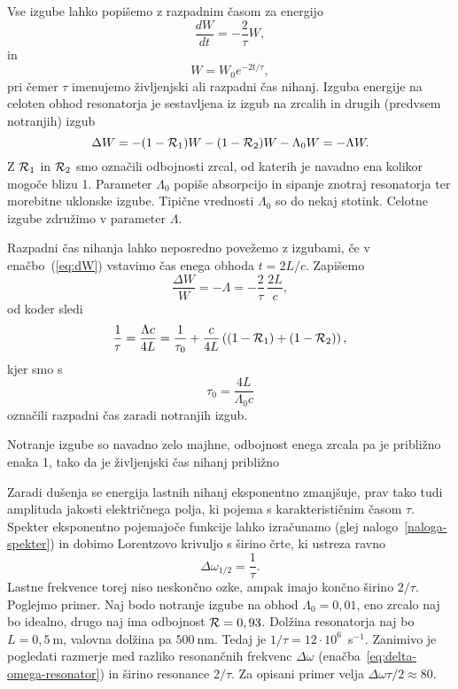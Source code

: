 Vse izgube lahko popišemo z razpadnim časom za energijo 
\begin{equation}
\frac{dW}{dt}=-\frac{2}{\tau}W,
\label{eq:dW}
\end{equation}
in 
\begin{equation}
W = W_0 e^{-2t/\tau},
\label{eq:dW1}
\end{equation}
pri čemer $\tau$ imenujemo življenjski ali razpadni čas nihanj.
Izguba energije na celoten obhod resonatorja je
sestavljena iz izgub na zrcalih in drugih (predvsem notranjih) izgub
\begin{equation}
\Delta W = -(1-{\cal R}_{1})W-(1-{\cal R}_{2})W -\Lambda_{0} W = -\Lambda W.
\label{eq:Lambda}
\end{equation}
Z ${\cal R}_{1}$ in ${\cal R}_{2}$ smo označili odbojnosti zrcal, od katerih je navadno ena
kolikor mogoče blizu 1. Parameter $\Lambda_{0}$ popiše absorpcijo in
sipanje znotraj resonatorja ter morebitne uklonske izgube. Tipične vrednosti 
$\Lambda_0$ so do nekaj stotink. Celotne izgube združimo v parameter $\Lambda$. 

Razpadni čas nihanja lahko neposredno povežemo z izgubami, če v enačbo~(\ref{eq:dW})
vstavimo čas enega obhoda $t=2L/c$. Zapišemo
\begin{equation}
\frac{\Delta W}{W}= -\Lambda = -\frac{2}{\tau}\, \frac{2L}{c},
\end{equation}
od koder sledi
\begin{equation}
\frac{1}{\tau}=\frac{\Lambda c}{4L}=\frac{1}{\tau_{0}}+\frac{c}{4L}\left((1-{\cal R}_{1})
+(1-{\cal R}_{2})\right),
\label{taulambda}
\end{equation}
kjer smo s 
\begin{equation}
\tau_{0}=\frac{4L}{\Lambda_0 c}
\label{eq:tau0n}
\end{equation}
označili razpadni čas zaradi notranjih izgub. 

Notranje izgube so navadno zelo majhne, odbojnost enega zrcala
pa je približno enaka 1, tako da je življenjski čas nihanj približno

Zaradi dušenja se energija lastnih nihanj eksponentno zmanjšuje, prav tako tudi
amplituda jakosti električnega polja, ki pojema s karakterističnim časom $\tau$. 
Spekter eksponentno pojemajoče funkcije lahko izračunamo
(glej nalogo~\ref{naloga-spekter}) in dobimo Lorentzovo krivuljo 
s širino črte, ki ustreza ravno
\begin{equation}
\Delta\omega_{1/2}=\frac{1}{\tau}.
\label{3.26}
\end{equation}
Lastne frekvence torej niso neskončno ozke, ampak imajo končno širino $2/\tau$.
Poglejmo primer. Naj bodo notranje izgube na obhod $\Lambda_0=0,01$,
eno zrcalo naj bo idealno, drugo naj ima odbojnost ${\cal R}=0,93$. Dolžina
resonatorja naj bo $L=0,5~\si{\metre}$, valovna dolžina pa $500~\si{\nano\metre}$. Tedaj
je $1/\tau=12\cdot10^{6}$~s$^{-1}$. Zanimivo je pogledati razmerje med 
razliko resonančnih frekvenc $\Delta \omega$ 
(enačba~\ref{eq:delta-omega-resonator}) in širino resonance $2/\tau$. 
Za opisani primer velja $\Delta\omega\tau/2 \approx 80$.

